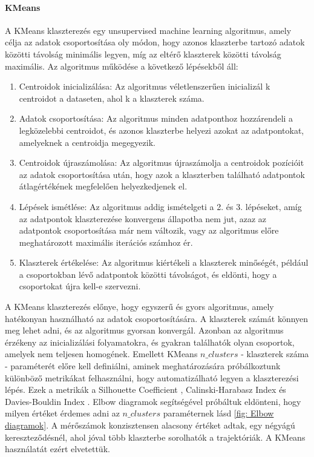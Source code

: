 \documentclass[acmtog, authorversion]{acmart}
\begin{document}
\paragraph{KMeans} A KMeans klaszterezés egy unsupervised machine learning algoritmus, amely célja az adatok csoportosítása oly módon, hogy azonos klaszterbe tartozó adatok közötti távolság minimális legyen, míg az eltérő klaszterek közötti távolság maximális.
Az algoritmus működése a következő lépésekből áll:
\begin{enumerate}
    \item Centroidok inicializálása: Az algoritmus véletlenszerűen inicializál k centroidot a dataseten, ahol k a klaszterek száma.
    \item Adatok csoportosítása: Az algoritmus minden adatponthoz hozzárendeli a legközelebbi centroidot, és azonos klaszterbe helyezi azokat az adatpontokat, amelyeknek a centroidja megegyezik.
    \item Centroidok újraszámolása: Az algoritmus újraszámolja a centroidok pozícióit az adatok csoportosítása után, hogy azok a klaszterben található adatpontok átlagértékének megfelelően helyezkedjenek el.
    \item Lépések ismétlése: Az algoritmus addig ismételgeti a 2. és 3. lépéseket, amíg az adatpontok klaszterezése konvergens állapotba nem jut, azaz az adatpontok csoportosítása már nem változik, vagy az algoritmus előre meghatározott maximális iterációs számhoz ér.
    \item Klaszterek értékelése: Az algoritmus kiértékeli a klaszterek minőségét, például a csoportokban lévő adatpontok közötti távolságot, és eldönti, hogy a csoportokat újra kell-e szervezni.
\end{enumerate}
A KMeans klaszterezés előnye, hogy egyszerű és gyors algoritmus, amely hatékonyan használható az adatok csoportosítására. A klaszterek számát könnyen meg lehet adni, és az algoritmus gyorsan konvergál. Azonban az algoritmus érzékeny az inicializálási folyamatokra, és gyakran találhatók olyan csoportok, amelyek nem teljesen homogének.
Emellett KMeans $n\_clusters$ - klaszterek száma - paraméterét előre kell definiálni, aminek meghatározására próbálkoztunk különböző metrikákat felhasználni, hogy automatizálható legyen
a klaszterezési lépés. Ezek a metrikák a Silhouette Coefficient \cite{ROUSSEEUW198753}, Calinski-Harabasz Index \cite{article} és Davies-Bouldin Index \cite{4766909}.
Elbow diagramok segítségével próbáltuk eldönteni, hogy milyen értéket érdemes adni az \begin{math}n\_clusters\end{math} paraméternek lásd \ref{fig: Elbow diagramok}.
A mérőszámok konzisztensen alacsony értéket adtak, egy négyágú kereszteződésnél, ahol jóval több klaszterbe sorolhatók a trajektóriák. A KMeans használatát
ezért elvetettük.
\end{document}
